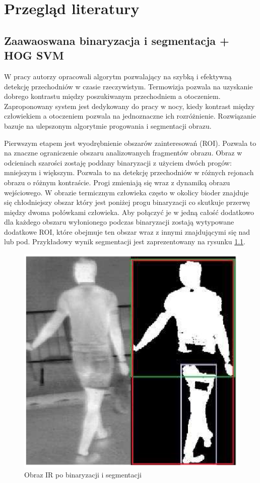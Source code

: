 \chapter{Przegląd literatury}
\label{cha:przegLiter}


\section{Zaawaoswana binaryzacja i segmentacja + HOG SVM} %
W pracy \cite{kolzpoz} autorzy opracowali algorytm pozwalający na szybką i efektywną detekcję przechodniów w czasie rzeczywistym. 
Termowizja pozwala na uzyskanie dobrego kontrastu między poszukiwanym przechodniem a otoczeniem. 
Zaproponowany system jest dedykowany do pracy w nocy, kiedy kontrast między człowiekiem a otoczeniem pozwala na jednoznaczne ich rozróżnienie. %
Rozwiązanie bazuje na ulepszonym algorytmie progowania i segmentacji obrazu. 

Pierwszym etapem jest wyodrębnienie obszarów zainteresowań (ROI).
Pozwala to na znaczne ograniczenie obszaru analizowanych fragmentów obrazu. %
Obraz w odcieniach szarości zostaję poddany binaryzacji z użyciem dwóch progów: mniejszym i większym. Pozwala to na detekcję przechodniów w różnych rejonach obrazu o różnym kontraście. 
Progi zmieniają się wraz z dynamiką obrazu wejściowego. 
W obrazie termicznym człowieka często w okolicy bioder znajduje się chłodniejszy obszar który jest poniżej progu binaryzacji co skutkuje przerwę między dwoma połówkami człowieka. Aby połączyć je w jedną całość dodatkowo dla każdego obszaru wyłonionego podczas binaryzacji zostają wytypowane dodatkowe ROI, które obejmuje ten obszar wraz z innymi znajdującymi się nad lub pod. Przykładowy wynik segmentacji jest zaprezentowany na rysunku \ref{fig:S_IR}. 

\begin{figure}
\centering
\includegraphics[width=0.4\linewidth]{images/S_IR}
\caption[Obraz IR po binaryzacji i segmentacji.]{Obraz IR po binaryzacji i segmentacji \cite{kolzpoz}}
\label{fig:S_IR}
\end{figure}

